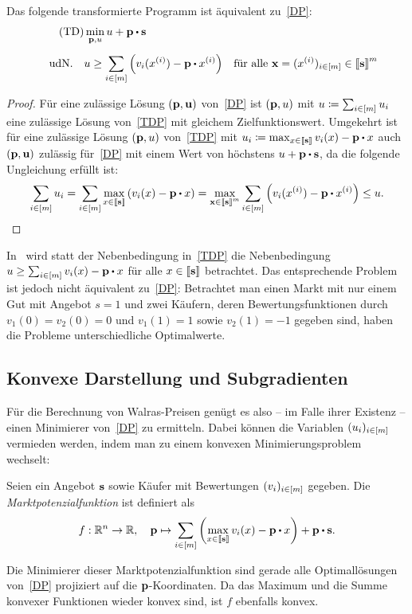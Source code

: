 \begin{lemma}
	Das folgende transformierte Programm ist äquivalent zu~\eqref{DP}: \emph{
	\begin{align*}
		\tag{TD}\label{TDP}
		&\min_{\fp, u} u + \fp \bcdot \fs \\[5pt]
	\text{udN.}\quad& u \geq \sum_{i\in\first{m}} \left( v_i(x^{(i)}) - \fp \bcdot x^{(i)} \right) & \text{für alle $\fx = (x^{(i)})_{i\in\first{m}}\in\ffirst{\fs}^m$}
	\end{align*}
}
\end{lemma}
\begin{proof}
	Für eine zulässige Lösung $(\mathbf{p}, \mathbf{u})$ von~\eqref{DP} ist $(\mathbf{p}, u)$ mit $u\coloneqq \sum_{i\in\left[ m \right]} u_i$ eine zulässige Lösung von~\eqref{TDP} mit gleichem Zielfunktionswert.
	Umgekehrt ist für eine zulässige Lösung $(\mathbf{p}, u)$ von~\eqref{TDP} mit $u_i\coloneqq \max_{x\in\ffirst{\fs}} v_i(x) - \fp \bcdot x$ auch $(\mathbf{p}, \mathbf{u})$ zulässig für~\eqref{DP} mit einem Wert von höchstens $u+\fp\bcdot \fs$, da die folgende Ungleichung erfüllt ist: \[
		\sum_{i\in\first{m}} u_i = \sum_{i\in\first{m}} \max_{x\in\ffirst{\fs}} \left( v_i(x) - \fp \bcdot x \right) = \max_{\fx\in\ffirst{\fs}^m} \sum_{i\in\first{m}} \left( v_i(x^{(i)}) - \fp \bcdot x^{(i)} \right) \leq u.
	\]
\end{proof}
\begin{bemerkung} 
	In~\cite{PaesLeme2018} wird statt der Nebenbedingung in~\eqref{TDP} die Nebenbedingung $u \geq \sum_{i\in\first{m}} v_i(x) - \fp \bcdot x$ für alle $x\in\left\llbracket \mathbf{s} \right\rrbracket$ betrachtet.
	Das entsprechende Problem ist jedoch nicht äquivalent zu~\eqref{DP}:
	Betrachtet man einen Markt mit nur einem Gut mit Angebot $s=1$ und zwei Käufern, deren Bewertungsfunktionen durch $v_1(0)=v_2(0)=0$ und $v_1(1)=1$ sowie $v_2(1) = -1$ gegeben sind, haben die Probleme unterschiedliche Optimalwerte.
\end{bemerkung}

\subsection{Konvexe Darstellung und Subgradienten}

Für die Berechnung von Walras-Preisen genügt es also -- im Falle ihrer Existenz -- einen Minimierer von~\eqref{DP} zu ermitteln.
Dabei können die Variablen $(u_i)_{i\in\left[ m \right]}$ vermieden werden, indem man zu einem konvexen Minimierungsproblem wechselt:
\begin{definition}
	Seien ein Angebot $\mathbf{s}$ sowie Käufer mit Bewertungen $(v_i)_{i\in\left[ m \right]}$ gegeben. Die \emph{Marktpotenzialfunktion} ist definiert als
	\[ f:\R^n \rightarrow \R,\quad \fp \mapsto \sum_{i\in\first{m}} \left( \max_{x\in\ffirst{\fs}} v_i(x) - \fp \bcdot x \right) + \fp \bcdot \fs. \]
\end{definition}
Die Minimierer dieser Marktpotenzialfunktion sind gerade alle Optimallösungen von~\eqref{DP} projiziert auf die $\mathbf{p}$-Koordinaten.
Da das Maximum und die Summe konvexer Funktionen wieder konvex sind, ist $f$ ebenfalls konvex.

